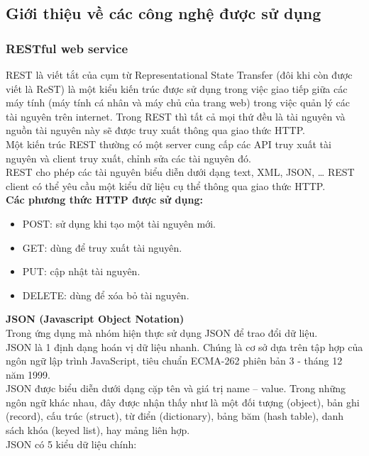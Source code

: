 \documentclass[a4paper,12pt,oneside]{article}
\begin{document}
\subsection{Giới thiệu về các công nghệ được sử dụng}
\subsubsection{RESTful web service}
\noindent REST là viết tắt của cụm từ Representational State Transfer (đôi khi còn được viết là ReST) là một kiểu kiến trúc được sử dụng trong việc giao tiếp giữa các máy tính (máy tính cá nhân và máy chủ của trang web) trong việc quản lý các tài nguyên trên internet. Trong REST thì tất cả mọi thứ đều là tài nguyên và nguồn tài nguyên này sẽ được truy xuất thông qua giao thức HTTP.\\
\noindent Một kiến trúc REST thường có một server cung cấp các API truy xuất tài nguyên và client truy xuất, chỉnh sửa các tài nguyên đó.\\
\noindent REST cho phép các tài nguyên biểu diễn dưới dạng text, XML, JSON, … REST client có thể yêu cầu một kiểu dữ liệu cụ thể thông qua giao thức HTTP.\\
\textbf{Các phương thức HTTP được sử dụng:}
\begin{itemize}
\item POST: sử dụng khi tạo một tài nguyên mới.
\item GET: dùng để truy xuất tài nguyên.
\item PUT: cập nhật tài nguyên.
\item DELETE: dùng để xóa bỏ tài nguyên.
\end{itemize}
\textbf{JSON (Javascript Object Notation)}\\
 Trong ứng dụng mà nhóm hiện thực sử dụng JSON để trao đổi dữ liệu.\\
 JSON là 1 định dạng hoán vị dữ liệu nhanh. Chúng là cơ sở dựa trên tập hợp của ngôn ngữ lập trình JavaScript, tiêu chuẩn ECMA-262 phiên bản 3 - tháng 12 năm 1999.\\
 JSON được biểu diễn dưới dạng cặp tên và giá trị name – value. Trong những ngôn ngữ khác nhau, đây được nhận thấy như là một đối tượng (object), bản ghi (record), cấu trúc (struct), từ điển (dictionary), bảng băm (hash table), danh sách khóa (keyed list), hay mảng liên hợp.\\
 JSON có 5 kiểu dữ liệu chính:
\end{document}
